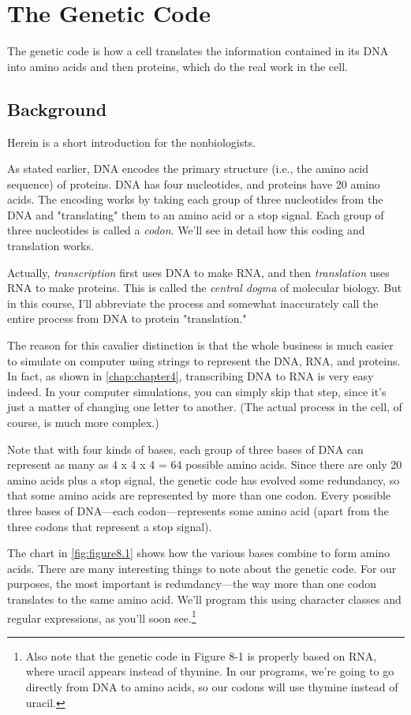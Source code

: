 \section{The Genetic Code}
The genetic code is how a cell translates the information contained in its DNA into amino acids and then proteins, which do the real work in the cell.

\subsection{Background}
Herein is a short introduction for the nonbiologists.

As stated earlier, DNA encodes the primary structure (i.e., the amino acid sequence) of proteins. DNA has four nucleotides, and proteins have 20 amino acids. The encoding works by taking each group of three nucleotides from the DNA and "translating" them to an amino acid or a stop signal. Each group of three nucleotides is called a \textit{codon}. We'll see in detail how this coding and translation works.

Actually, \textit{transcription} first uses DNA to make RNA, and then \textit{translation} uses RNA to make proteins. This is called the \textit{central dogma} of molecular biology. But in this course, I'll abbreviate the process and somewhat inaccurately call the entire process from DNA to protein "translation."

The reason for this cavalier distinction is that the whole business is much easier to simulate on computer using strings to represent the DNA, RNA, and proteins. In fact, as shown in \autoref{chap:chapter4}, transcribing DNA to RNA is very easy indeed. In your computer simulations, you can simply skip that step, since it's just a matter of changing one letter to another. (The actual process in the cell, of course, is much more complex.)

Note that with four kinds of bases, each group of three bases of DNA can represent as many as 4 x 4 x 4 = 64 possible amino acids. Since there are only 20 amino acids plus a stop signal, the genetic code has evolved some redundancy, so that some amino acids are represented by more than one codon. Every possible three bases of DNA—each codon—represents some amino acid (apart from the three codons that represent a stop signal). 

The chart in \autoref{fig:figure8.1} shows how the various bases combine to form amino acids. There are many interesting things to note about the genetic code. For our purposes, the most important is redundancy—the way more than one codon translates to the same amino acid. We'll program this using character classes and regular expressions, as you'll soon see.\footnote{Also note that the genetic code in Figure 8-1 is properly based on RNA, where uracil appears instead of thymine. In our programs, we're going to go directly from DNA to amino acids, so our codons will use thymine instead of uracil.}

